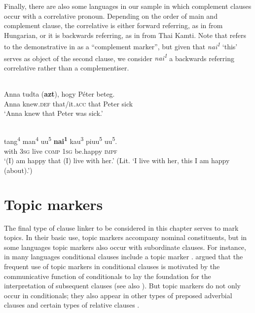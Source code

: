 \documentclass[output=paper,colorlinks,citecolor=brown]{langscibook}
\begin{document}
Finally, there are also some languages in our sample in which complement clauses occur with a correlative pronoun. Depending on the order of main and complement clause, the correlative is either forward referring, as in  from Hungarian, or it is backwards referring, as in  from Thai Kamti. Note that \citet[119]{Inglis2014} refers to the demonstrative in  as a “complement marker”, but given that \textit{nai\textsuperscript{1}} ‘this’ serves as object of the second clause, we consider \textit{nai\textsuperscript{1}} a backwards referring correlative rather than a complementiser.

\ea\label{ex:diessel:44}
\\
\gll Anna tudta (\textbf{azt}), hogy Péter beteg.\\
     Anna knew.\textsc{def} that/it.\textsc{acc} that Peter sick \\
\glt ‘Anna knew that Peter was sick.’
\z

\ea\label{ex:diessel:45}
\\
\gll {\ob}tang\textsuperscript{4}  man\textsuperscript{4}  uu\textsuperscript{5}{\cb}  \textbf{nai\textsuperscript{1}}    kau\textsuperscript{3}  piuu\textsuperscript{5}  uu\textsuperscript{5}.\\
     {\db}with   \textsc{3sg}  live  \textsc{comp}   \textsc{1sg}  be.happy  \textsc{impf}\\
\glt ‘(I) am happy that (I) live with her.’ (Lit. ‘I live with her, this I am happy (about).’)
\z

\section{Topic markers}\label{sec:diessel:9}

The final type of clause linker to be considered in this chapter serves to mark topics. In their basic use, topic markers accompany nominal constituents, but in some languages topic markers also occur with subordinate clauses. For instance, in many languages conditional clauses include a topic marker \citep{Haiman1985}. \citet{Haiman1978} argued that the frequent use of topic markers in conditional clauses is motivated by the communicative function of conditionals to lay the foundation for the interpretation of subsequent clauses (see also \citealt{Diessel2005Demonstratives}). But topic markers do not only occur in conditionals; they also appear in other types of preposed adverbial clauses \citep{ThompsonEtAl2007} and certain types of relative clauses \citep{Vries1995}. 
\end{document}
